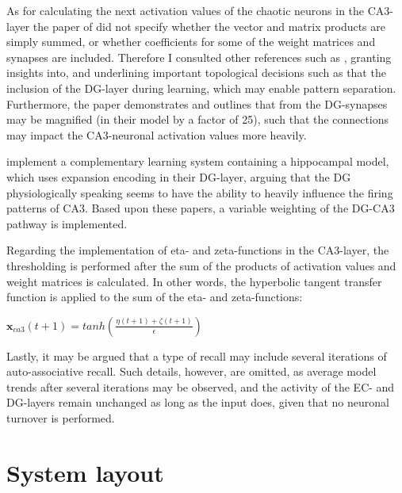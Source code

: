 As for calculating the next activation values of the chaotic neurons in the CA3-layer the paper of \cite{Hattori2014} did not specify whether the vector and matrix products are simply summed, or whether coefficients for some of the weight matrices and synapses are included. Therefore I consulted other references such as \citep{Wakagi2008}, granting insights into, and underlining important topological decisions such as that the inclusion of the DG-layer during learning, which may enable pattern separation. Furthermore, the paper demonstrates and outlines that from the DG-synapses may be magnified (in their model by a factor of 25), such that the connections may impact the CA3-neuronal activation values more heavily.

\cite{Norman2003} implement a complementary learning system containing a hippocampal model, which uses expansion encoding in their DG-layer, arguing that the DG physiologically speaking seems to have the ability to heavily influence the firing patterns of CA3. 
Based upon these papers, a variable weighting of the DG-CA3 pathway is implemented.

Regarding the implementation of eta- and zeta-functions in the CA3-layer, the thresholding is performed after the sum of the products of activation values and weight matrices is calculated. In other words, the hyperbolic tangent transfer function is applied to the sum of the eta- and zeta-functions: 

\begin{center}
\begin{math}
    \textbf{x}_{ca3}(t+1) = tanh(\frac{\eta(t+1) + \zeta(t+1)}{\epsilon})
\end{math}
\end{center}

Lastly, it may be argued that a type of recall may include several iterations of auto-associative recall. Such details, however, are omitted, as average model trends after several iterations may be observed, and the activity of the EC- and DG-layers remain unchanged as long as the input does, given that no neuronal turnover is performed.


\section{System layout}

